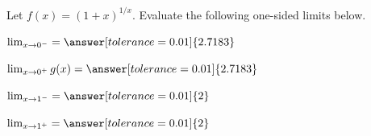 \documentclass{ximera}
\begin{document}
\begin{question}
Let $f(x) = (1+x)^{1/x}$. Evaluate the following one-sided limits below.	

$\lim_{x \rightarrow {0}^{-}}  = \answer[tolerance=0.01]{2.7183}$

$\lim_{x \rightarrow {0}^{+}} g(x) = \answer[tolerance=0.01]{2.7183}$

$\lim_{x \rightarrow {1}^{-}}  = \answer[tolerance=0.01]{2}$
	
$\lim_{x \rightarrow {1}^{+}}  = \answer[tolerance=0.01]{2}$
\end{question}
\end{document}
